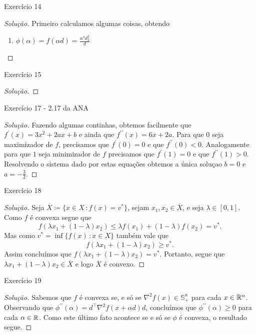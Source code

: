 \documentclass[12pt,twoside,a4paper]{article}
\begin{document}
\begin{problema}
  Exercício 14
\end{problema}
\begin{proof}[Solução]
  Primeiro calculamos algumas coisas, obtendo
  \begin{enumerate}
  \item \(\phi(\alpha)=f(\alpha d)=\frac{\alpha^4d_2^2}{d}\)  
  \end{enumerate}
\end{proof}

\begin{problema}
  Exercício 15
\end{problema}
\begin{proof}[Solução]
  
\end{proof}

\begin{problema}
 Exercício 17 - 2.17 da ANA  
 \end{problema}
 \begin{proof}[Solução]
   Fazendo algumas continhas, obtemos facilmente que
   \(f^\prime(x)= 3x^2+2ax+b\) e
  ainda que \(f^{\prime\prime}(x)=6x+2a\). Para que \(0\) seja maximizador
  de
  \(f\), precisamos que \(f^\prime(0) =0\) e que \(f^{\prime\prime}(0)<0\).
  Analogamente para que \(1\) seja minimizador de \(f\) precisamos que
  \(f^\prime(1)=0\) e que \(f^{\prime\prime}(1)>0\). Resolvendo o sistema
  dado por estas equações obtemos a única soluçao \(b=0\) e \(a=-\frac{3}{2}\). 
 \end{proof}

\begin{problema}
Exercício 18
\end{problema}
\begin{proof}[Solução]
  Seja \(\overline{X}\coloneqq\{x\in X\,\colon f(x)=v^\ast\}\), sejam
  \(x_1,x_2\in\overline{X}\), e seja \(\lambda\in [0,1]\). Como \(f\)
  é convexa segue que \[f(\lambda x_1+ (1-\lambda)x_2)\leq\lambda
    f(x_1)+(1-\lambda)f(x_2)=v^\ast.\]
  Mas como \(v^\ast=\inf\{f(x)\,\colon x\in X\}\) também vale que
  \[f(\lambda x_1+ (1-\lambda)x_2)\geq v^\ast.\]
  Assim concluímos que \(f(\lambda x_1+ (1-\lambda)x_2)= v^\ast.\) Portanto,
  segue que \(\lambda x_1 + (1-\lambda)x_2\in\overline{X}\) e logo
  \(\overline{X}\) é convexo.
\end{proof}

\begin{problema}\label{phiconv}
 Exercício 19
\end{problema}
\begin{proof}[Solução]
  Sabemos que \(f\) é convexa se, e só se
  \(\nabla^2f(x)\in\mathbb{S}^n_+\) para cada \(x\in\mathbb{R}^n\). Observando
  que \(\phi^{\prime\prime}(\alpha)=d^\top\nabla^2f(x+\alpha d) d\),
  concluímos que \(\phi^{\prime\prime}(\alpha)\geq 0\) para cada
  \(\alpha\in\mathbb{R}\). Como este último fato acontece se e só se \(\phi\)
  é convexa, o resultado segue.
\end{proof}
\end{document}
